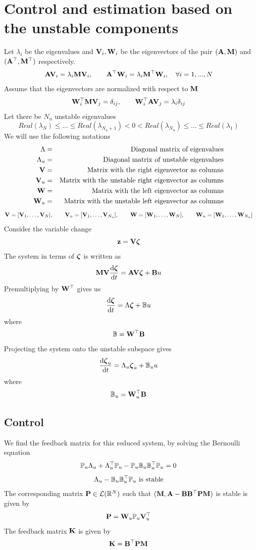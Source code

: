 \documentclass[12pt]{article}
\begin{document}
\section{Control and estimation based on the unstable components}
Let $\lambda_i$ be the eigenvalues and ${\mathbf V}_i, {\mathbf W}_i$ be the eigenvectors of the pair $({\mathbf A},{\mathbf M})$ and $({\mathbf A}^\top,{\mathbf M}^\top)$ respectively.
\[
 {\mathbf A} {\mathbf V}_i = \lambda_i {\mathbf M} {\mathbf V}_i, \qquad {\mathbf A}^\top {\mathbf W}_i = \lambda_i {\mathbf M}^\top {\mathbf W}_i, \quad \forall i = 1,...,N
\]
Assume that the eigenvectors are normalized with respect to ${\mathbf M}$
\begin{equation}
 {\mathbf W}_i^\top {\mathbf M} {\mathbf V}_j = \delta_{ij}, \qquad
 {\mathbf W}_i^\top {\mathbf A} {\mathbf V}_j = \lambda_i \delta_{ij}
\label{eq:orthcond}
\end{equation}
Let there be $N_u$ unstable eigenvalues
\[
 Real(\lambda_{N}) \le \ldots \le Real(\lambda_{N_u +1}) < 0 < Real(\lambda_{N_u}) \le \ldots \le Real(\lambda_1)
\]
We will use the following notations 
\begin{eqnarray*}
\Lambda &=& \mbox{Diagonal matrix of eigenvalues} \\
\Lambda_u &=& \mbox{Diagonal matrix of unstable eigenvalues} \\
{\mathbf V} &=& \mbox{Matrix with the right eigenvector as columns} \\
{\mathbf V}_u &=& \mbox{Matrix with the unstable right eigenvector as columns} \\
{\mathbf W} &=& \mbox{Matrix with the left eigenvector as columns} \\
{\mathbf W}_u &=& \mbox{Matrix with the unstable left eigenvector as columns} \\
\end{eqnarray*}
\[
{\mathbf V} = [{\mathbf V}_1, \ldots, {\mathbf V}_N], \qquad {\mathbf V}_u = [{\mathbf V}_1, \ldots, {\mathbf V}_{N_u}], \qquad {\mathbf W} = [{\mathbf W}_1, \ldots, {\mathbf W}_N], \qquad {\mathbf W}_u = [{\mathbf W}_1, \ldots, {\mathbf W}_{N_u}]
\]
Consider the variable change
\[
 {\mathbf z} = {\mathbf V} \boldsymbol{\zeta}
\]
The system in terms of $\boldsymbol{\zeta}$ is written as
\[
 {\mathbf M} {\mathbf V} \frac{\textrm{d} \boldsymbol{\zeta}}{\textrm{d} t} = {\mathbf A} {\mathbf V} \boldsymbol{\zeta} + {\mathbf B} u
\]
Premultiplying by ${\mathbf W}^\top$ gives us
\[
 \frac{\textrm{d} \boldsymbol{\zeta}}{\textrm{d} t} = \Lambda \boldsymbol{\zeta} + \mathbb{B} u
\]
where
\[
 \mathbb{B} = {\mathbf W}^\top {\mathbf B}
\]
Projecting the system onto the unstable subspace gives
\[
 \frac{\textrm{d} \boldsymbol{\zeta}_u}{\textrm{d} t} = \Lambda_u \boldsymbol{\zeta}_u + \mathbb{B}_u u
\]
where
\[
\mathbb{B}_u = {\mathbf W}^\top_u {\mathbf B}
\]

\subsection{Control}
We find the feedback matrix for this reduced system, by solving the Bernoulli equation
\begin{equation}
 \mathbb{P}_u \Lambda_u + \Lambda^\top_u \mathbb{P}_u - \mathbb{P}_u \mathbb{B}_u \mathbb{B}_u^\top \mathbb{P}_u = 0
\label{eq:ricu}
\end{equation}
\[
 \Lambda_u - \mathbb{B}_u \mathbb{B}_u^\top \mathbb{P}_u \text{ is stable}
\]
The corresponding matrix ${\mathbf P} \in \mathcal{L}(\mathbb{R}^{N})$ such that $({\mathbf M},{\mathbf A} - {\mathbf B}{\mathbf B}^\top{\mathbf P}{\mathbf M})$ is stable is given by
\[
 {\mathbf P} = {\mathbf W}_u \mathbb{P}_u {\mathbf V}_u^\top
\]
The feedback matrix ${\mathbf K}$ is given by
\[
 {\mathbf K} = {\mathbf B}^\top{\mathbf P}{\mathbf M}
\]
\end{document}
